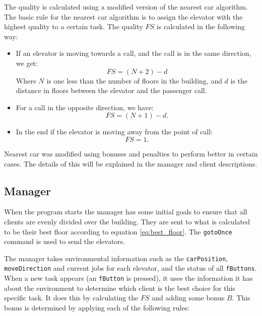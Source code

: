 \documentclass[a4paper,11pt,twocolumn]{article}
\begin{document}
The quality is calculated using a modified version of the nearest car algorithm. The basic rule for the nearest car algorithm is to assign the elevator with the highest quality to a certain task. The quality $FS$ is calculated in the following way:
\begin{itemize}
 \item If an elevator is moving towards a call, and the call is in the same direction, we get:
\begin{equation}
 \label{eq:nearest_car1}
 FS = (N + 2) - d
\end{equation}
 Where $N$ is one less than the number of floors in the building, and $d$ is the distance in floors between the elevator and the passenger call.
 \item For a call in the opposite direction, we have:
\begin{equation}
\label{eq:nearest_car2}
 FS = (N + 1) - d.
\end{equation}
 \item In the end if the elevator is moving away from the point of call: 
 \begin{equation}
 \label{eq:nearest_car3}
  FS = 1.
 \end{equation}
\end{itemize}
Nearest car was modified using bonuses and penalties to perform better in certain cases. The details of this will be explained in the manager and client descriptions.


\subsection{Manager}
When the program starts the manager has some initial goals to ensure that all clients are evenly divided over the building. They are sent to what is calculated to be their best floor according to equation \ref{eq:best_floor}. The \texttt{gotoOnce} command is used to send the elevators.

The manager takes environmental information such as the \texttt{carPosition}, \texttt{moveDirection} and current jobs for each elevator, and the status of all \texttt{fButtons}. When a new task appears (an \texttt{fButton} is pressed), it uses the information it has about the environment to determine which client is the best choice for this specific task. It does this by calculating the $FS$ and adding some bonus $B$. This bonus is determined by applying each of the following rules:
\end{document}
